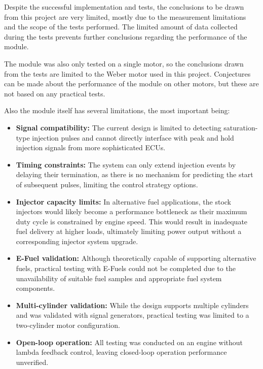         Despite the successful implementation and tests, the conclusions to be drawn from this project are very limited, mostly due to the measurement limitations and the scope of the tests performed. The limited amount of data collected during the tests prevents further conclusions regarding the performance of the module.

        The module was also only tested on a single motor, so the conclusions drawn from the tests are limited to the Weber motor used in this project. Conjectures can be made about the performance of the module on other motors, but these are not based on any practical tests.

        Also the module itself has several limitations, the most important being:
        
        \begin{itemize}
            \item \textbf{Signal compatibility:} The current design is limited to detecting saturation-type injection pulses and cannot directly interface with peak and hold injection signals from more sophisticated ECUs.
            
            \item \textbf{Timing constraints:} The system can only extend injection events by delaying their termination, as there is no mechanism for predicting the start of subsequent pulses, limiting the control strategy options.
            
            \item \textbf{Injector capacity limits:} In alternative fuel applications, the stock injectors would likely become a performance bottleneck as their maximum duty cycle is constrained by engine speed. This would result in inadequate fuel delivery at higher loads, ultimately limiting power output without a corresponding injector system upgrade.
            
            \item \textbf{E-Fuel validation:} Although theoretically capable of supporting alternative fuels, practical testing with E-Fuels could not be completed due to the unavailability of suitable fuel samples and appropriate fuel system components.
            
            \item \textbf{Multi-cylinder validation:} While the design supports multiple cylinders and was validated with signal generators, practical testing was limited to a two-cylinder motor configuration.
            
            \item \textbf{Open-loop operation:} All testing was conducted on an engine without lambda feedback control, leaving closed-loop operation performance unverified.
        \end{itemize}


